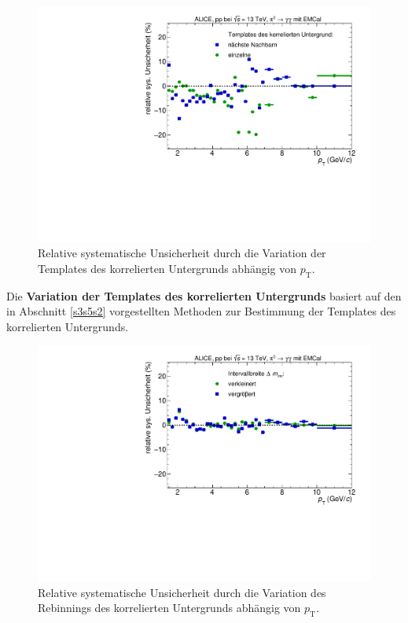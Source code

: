 \begin{figure}[t!]
\centering
\includegraphics[width=.65\linewidth]{YieldsSysUncerBkgVariation_Data_2016.pdf}
\caption{Relative systematische Unsicherheit durch die Variation der Templates des korrelierten Untergrunds abhängig von $p_\text{T}$.}
\label{fig:BkgSys}
\end{figure}
\newline
Die \textbf{Variation der Templates des korrelierten Untergrunds} basiert auf den in Abschnitt \ref{s3s5s2} vorgestellten Methoden zur Bestimmung der Templates des korrelierten Untergrunds.
\begin{figure}[t!]
\centering
\includegraphics[width=.65\linewidth]{YieldsSysUncerRebinning_Data_2016.pdf}
\caption{Relative systematische Unsicherheit durch die Variation des Rebinnings des korrelierten Untergrunds abhängig von $p_\text{T}$.}
\label{fig:BinningSys}
\end{figure}
